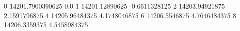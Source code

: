 0 14201.7900390625 0.0
1 14201.12890625 -0.6611328125
2 14203.94921875 2.1591796875
4 14205.96484375 4.1748046875
6 14206.5546875 4.7646484375
8 14206.3359375 4.5458984375
